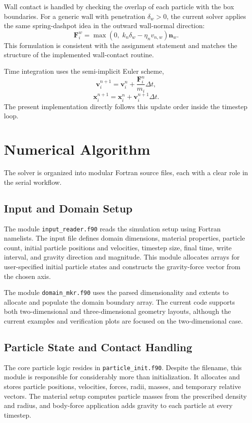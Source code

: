 \documentclass[conference]{IEEEtran}
\begin{document}
Wall contact is handled by checking the overlap of each particle with the box boundaries. For a generic wall with penetration $\delta_w > 0$, the current solver applies the same spring-dashpot idea in the outward wall-normal direction:
\begin{equation}
    \mathbf{F}^{w}_i =
    \max \left(0,\; k_n \delta_w - \eta_n v_{n,w} \right)\mathbf{n}_w.
\end{equation}
This formulation is consistent with the assignment statement and matches the structure of the implemented wall-contact routine.

Time integration uses the semi-implicit Euler scheme,
\begin{equation}
    \mathbf{v}^{n+1}_i = \mathbf{v}^{n}_i + \frac{\mathbf{F}^{n}_i}{m_i}\Delta t,
\end{equation}
\begin{equation}
    \mathbf{x}^{n+1}_i = \mathbf{x}^{n}_i + \mathbf{v}^{n+1}_i \Delta t.
\end{equation}
The present implementation directly follows this update order inside the timestep loop.

\section{Numerical Algorithm}
The solver is organized into modular Fortran source files, each with a clear role in the serial workflow.

\subsection{Input and Domain Setup}
The module \texttt{input\_reader.f90} reads the simulation setup using Fortran namelists. The input file defines domain dimensions, material properties, particle count, initial particle positions and velocities, timestep size, final time, write interval, and gravity direction and magnitude. This module allocates arrays for user-specified initial particle states and constructs the gravity-force vector from the chosen axis.

The module \texttt{domain\_mkr.f90} uses the parsed dimensionality and extents to allocate and populate the domain boundary array. The current code supports both two-dimensional and three-dimensional geometry layouts, although the current examples and verification plots are focused on the two-dimensional case.

\subsection{Particle State and Contact Handling}
The core particle logic resides in \texttt{particle\_init.f90}. Despite the filename, this module is responsible for considerably more than initialization. It allocates and stores particle positions, velocities, forces, radii, masses, and temporary relative vectors. The material setup computes particle masses from the prescribed density and radius, and body-force application adds gravity to each particle at every timestep.
\end{document}
